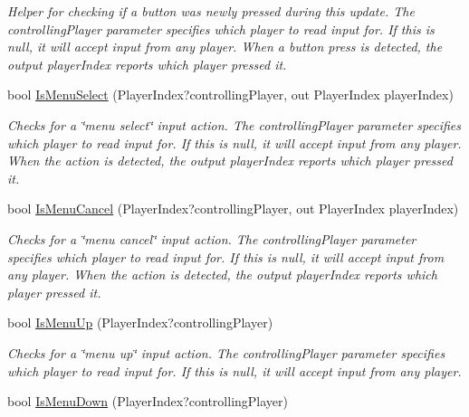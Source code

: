 \begin{DoxyCompactItemize}
\begin{DoxyCompactList}\small\item\em Helper for checking if a button was newly pressed during this update. The controllingPlayer parameter specifies which player to read input for. If this is null, it will accept input from any player. When a button press is detected, the output playerIndex reports which player pressed it. \item\end{DoxyCompactList}\item 
bool \hyperlink{classCityMania_1_1InputState_a35467f4216f2228c1288e738c1db7c4f}{IsMenuSelect} (PlayerIndex?controllingPlayer, out PlayerIndex playerIndex)
\begin{DoxyCompactList}\small\item\em Checks for a \char`\"{}menu select\char`\"{} input action. The controllingPlayer parameter specifies which player to read input for. If this is null, it will accept input from any player. When the action is detected, the output playerIndex reports which player pressed it. \item\end{DoxyCompactList}\item 
bool \hyperlink{classCityMania_1_1InputState_a4b2e434f6f379a0d6aa8f7ff9d915b7e}{IsMenuCancel} (PlayerIndex?controllingPlayer, out PlayerIndex playerIndex)
\begin{DoxyCompactList}\small\item\em Checks for a \char`\"{}menu cancel\char`\"{} input action. The controllingPlayer parameter specifies which player to read input for. If this is null, it will accept input from any player. When the action is detected, the output playerIndex reports which player pressed it. \item\end{DoxyCompactList}\item 
bool \hyperlink{classCityMania_1_1InputState_a8cb3c3fd9a65d6be25674a20a4c472b4}{IsMenuUp} (PlayerIndex?controllingPlayer)
\begin{DoxyCompactList}\small\item\em Checks for a \char`\"{}menu up\char`\"{} input action. The controllingPlayer parameter specifies which player to read input for. If this is null, it will accept input from any player. \item\end{DoxyCompactList}\item 
bool \hyperlink{classCityMania_1_1InputState_a3c1b0c6bd78fce6777cf3e66b11bab89}{IsMenuDown} (PlayerIndex?controllingPlayer)

\end{DoxyCompactItemize}
